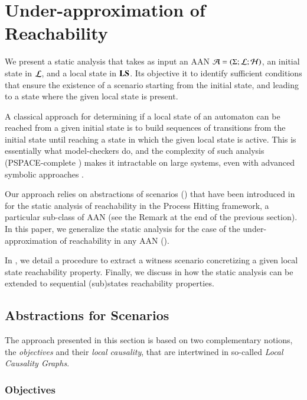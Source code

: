 \section{Under-approximation of Reachability}\label{sec:sa}

We present a static analysis that takes as input an AAN
$\mathcal{A} = (\Sigma; \mathcal{L}; \mathcal{H})$,
an initial state in $\mathcal{L}$, and a local state in $\mathbf{LS}$.
Its objective it to identify sufficient conditions
that ensure the existence of a scenario starting from the initial state,
and leading to a state where the given local state is present.

A classical approach for determining if a local state of an automaton can be
reached from a given initial state is to build sequences of transitions from the initial state
until reaching a state in which the given local state is active.
This is essentially what model-checkers do, and the complexity of such analysis (PSPACE-complete
\cite{Harel02}) makes it intractable on large systems, even with advanced symbolic approaches
\cite{PMR12-MSCS}.

Our approach relies on abstractions of scenarios () that have been introduced in
\cite{PMR12-MSCS} for the static analysis of reachability in the Process Hitting framework,
a particular sub-class of AAN (see the Remark at the end of the previous section).
In this paper, we generalize the static analysis for the case of the under-approximation of
reachability in any AAN ().

In , we detail a procedure to extract a witness scenario
concretizing a given local state reachability property.
Finally, we discuss in  how the static analysis can be
extended to sequential (sub)states reachability properties.


\subsection{Abstractions for Scenarios}
\label{ssec:abstr-sce}

The approach presented in this section is based on two complementary notions,
the \emph{objectives} and their \emph{local causality},
that are intertwined in so-called \emph{Local Causality Graphs}.

\subsubsection{Objectives}

